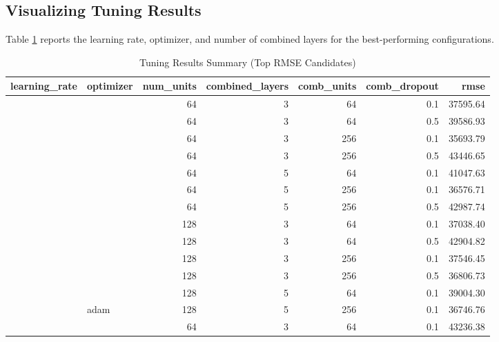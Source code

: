 \subsection{Visualizing Tuning Results}\label{visualizing-tuning-results}

Table \ref{tab:tuning-results-static} reports the learning rate, optimizer, and number of combined layers for the best-performing configurations.

\begin{table}
\centering
\caption{\label{tab:tuning-results-static}Tuning Results Summary (Top RMSE Candidates)}
\centering
\fontsize{7}{9}\selectfont
\begin{tabular}[t]{rlrrrrr}
\toprule
learning\_rate & optimizer & num\_units & combined\_layers & comb\_units & comb\_dropout & rmse\\
\midrule
 &  & 64 & 3 & 64 & 0.1 & 37595.64\\

 &  & 64 & 3 & 64 & 0.5 & 39586.93\\

 &  & 64 & 3 & 256 & 0.1 & 35693.79\\

 &  & 64 & 3 & 256 & 0.5 & 43446.65\\

 &  & 64 & 5 & 64 & 0.1 & 41047.63\\

 &  & 64 & 5 & 256 & 0.1 & 36576.71\\

 &  & 64 & 5 & 256 & 0.5 & 42987.74\\

 &  & 128 & 3 & 64 & 0.1 & 37038.40\\

 &  & 128 & 3 & 64 & 0.5 & 42904.82\\

 &  & 128 & 3 & 256 & 0.1 & 37546.45\\

 &  & 128 & 3 & 256 & 0.5 & 36806.73\\

 &  & 128 & 5 & 64 & 0.1 & 39004.30\\

 & \multirow{-13}{*}[\normalbaselineskip]{\raggedright\arraybackslash adam} & 128 & 5 & 256 & 0.1 & 36746.76\\

 &  & 64 & 3 & 64 & 0.1 & 43236.38\\


\end{tabular}
\end{table}
